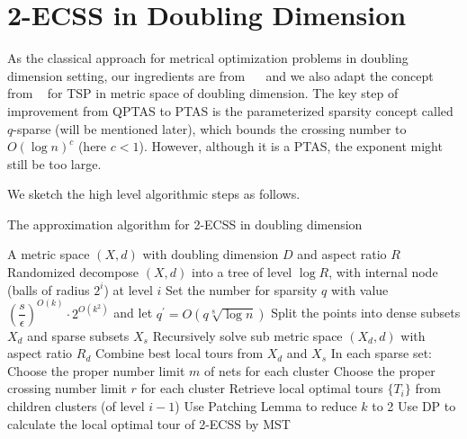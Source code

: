 \documentclass{llncs}
\begin{document}
\section{2-ECSS in Doubling Dimension}
\label{method}

As the classical approach for metrical optimization problems in doubling dimension setting, our ingredients are from ~\cite{Arora98}~\cite{Talwar04} and we also adapt the concept from ~\cite{Bartal12} for TSP in metric space of doubling dimension.
The key step of improvement from QPTAS to PTAS is the parameterized sparsity concept called $q$-sparse (will be mentioned later), which bounds the crossing number to $O(\log n)^c$ (here $c<1$).
However, although it is a PTAS, the exponent might still be too large.

We sketch the high level algorithmic steps as follows.
\begin{algorithm}[htb]
  \caption{The approximation algorithm for 2-ECSS in doubling dimension}
  \label{alg:Framework}
  \begin{algorithmic}[1]
    \Require
      A metric space $(X,d)$ with doubling dimension $D$ and aspect ratio $R$
    \State Randomized decompose $(X,d)$ into a tree of level $\log R$,
    \State with internal node (balls of radius $2^i$) at level $i$
    \State Set the number for sparsity $q$ with value ${(\dfrac{s}{\epsilon})}^{O(k)}\cdot2^{O(k^2)}$ and let $q^\prime=O(q\sqrt[8]{\log n})$
    \State Split the points into dense subsets $X_d$ and sparse subsets $X_s$
    \State Recursively solve sub metric space $(X_d, d)$ with aspect ratio $R_d$
    \State Combine best local tours from $X_d$ and $X_s$
    \EndIf
    \State In each sparse set:
    \State Choose the proper number limit $m$ of nets for each cluster
    \State Choose the proper crossing number limit $r$ for each cluster
    \State Retrieve local optimal tours $\{T_i\}$ from children clusters (of level $i-1$)
    \State Use Patching Lemma to reduce $k$ to 2
    \State Use DP to calculate the local optimal tour of 2-ECSS by MST
    \EndFor
    \EndFor
  \end{algorithmic}
\end{algorithm}
\end{document}
